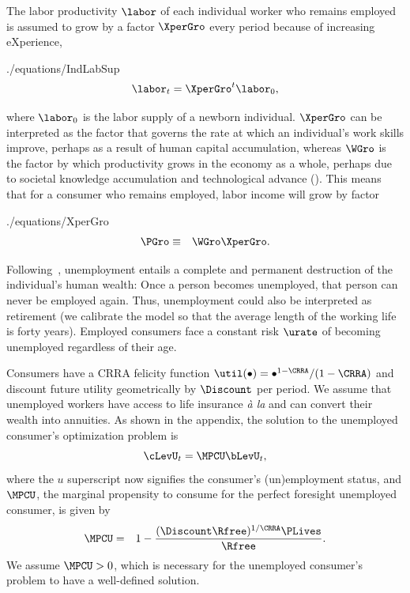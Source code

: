 \documentclass[titlepage]{\econtex}\newcommand{\texname}{cjSOE}
\begin{document}
The labor
productivity $\labor$ of each individual worker who remains employed
is assumed to grow by a factor $\XperGro$ every period because of increasing
eXperience,
\begin{verbatimwrite}{./equations/IndLabSup}
\begin{equation}
\labor_{t} =    \XperGro^t \labor_{0}
\label{eq:IndLabSup},
\end{equation}
\end{verbatimwrite}

where $\labor_0$ is the labor supply of a newborn
individual. $\XperGro$ can be interpreted as the factor that governs
the rate at which an individual's work skills improve, perhaps as a
result of human capital accumulation, whereas $\WGro$ is the factor by
which productivity grows in the economy as a whole, perhaps due to
societal knowledge accumulation and technological advance
(\cite{mankiw:growth}). This means that for a consumer who remains
employed, labor income will grow by factor
\begin{verbatimwrite}{./equations/XperGro}
\begin{eqnarray*}
\PGro & \equiv & \WGro \XperGro.
\end{eqnarray*}
\end{verbatimwrite}


Following~\cite{toche:urisk}, unemployment entails a complete and permanent destruction of the individual's human wealth: Once a person becomes unemployed, that person can never be employed
again. Thus, unemployment could also be interpreted as retirement (we calibrate the model so that the average length of the working life is forty years). Employed consumers face a constant risk $\urate$ of becoming unemployed regardless of their age.

Consumers have a CRRA felicity function $\util(\bullet)=
\bullet^{1-\CRRA}/(1-\CRRA)$ and discount future utility geometrically by $\Discount$ per period.
We assume that unemployed workers have access to life insurance {\it \`{a} la} \cite{blanchardFinite} and can convert their wealth into annuities.
As shown in the appendix, the solution to the unemployed consumer's optimization problem is
\begin{equation}
\cLevU_{t} = \MPCU \bLevU_t
\label{eq:cpfinfhorunemp} ,
\end{equation}
where the $u$ superscript now signifies the consumer's (un)employment status, and $\MPCU$, the marginal propensity to consume for the perfect foresight unemployed consumer, is given by
\begin{eqnarray}
\MPCU & = & 1- \frac{(\Discount \Rfree)^{1/\CRRA}\PLives}{\Rfree}.
\label{eq:kappaDef}
\end{eqnarray}
We assume $\MPCU > 0$, which is necessary for the unemployed consumer's problem to have a well-defined solution.
\end{document}
